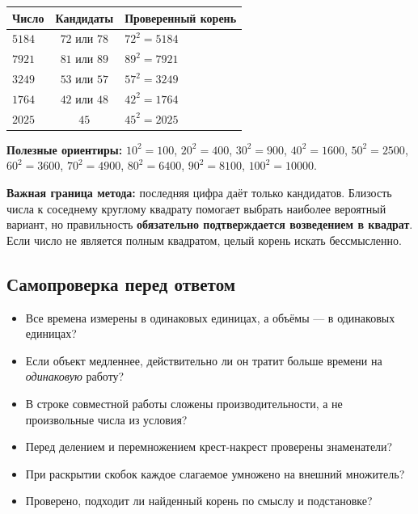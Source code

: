 \documentclass[a4paper,12pt]{article}
\newcommand{\subtopic}[1]{\subsection*{\textcolor{darkaccent}{#1}}}
\newcommand{\linekey}[1]{\textcolor{darkaccent}{\textbf{#1}}}
\begin{document}
\begin{center}
\begin{tabular}{@{}lcl@{}}
\toprule
Число & Кандидаты & Проверенный корень \\
\midrule
$5184$ & $72$ или $78$ & $72^2=5184$ \\
$7921$ & $81$ или $89$ & $89^2=7921$ \\
$3249$ & $53$ или $57$ & $57^2=3249$ \\
$1764$ & $42$ или $48$ & $42^2=1764$ \\
$2025$ & $45$ & $45^2=2025$ \\
\bottomrule
\end{tabular}
\end{center}

\linekey{Полезные ориентиры:} $10^2=100$, $20^2=400$, $30^2=900$, $40^2=1600$, $50^2=2500$, $60^2=3600$, $70^2=4900$, $80^2=6400$, $90^2=8100$, $100^2=10000$.

\textbf{Важная граница метода:} последняя цифра даёт только кандидатов. Близость числа к соседнему круглому квадрату помогает выбрать наиболее вероятный вариант, но правильность \textbf{обязательно подтверждается возведением в квадрат}. Если число не является полным квадратом, целый корень искать бессмысленно.

\subtopic{Самопроверка перед ответом}
\begin{itemize}
\item Все времена измерены в одинаковых единицах, а объёмы --- в одинаковых единицах?
\item Если объект медленнее, действительно ли он тратит больше времени на \emph{одинаковую} работу?
\item В строке совместной работы сложены производительности, а не произвольные числа из условия?
\item Перед делением и перемножением крест-накрест проверены знаменатели?
\item При раскрытии скобок каждое слагаемое умножено на внешний множитель?
\item Проверено, подходит ли найденный корень по смыслу и подстановке?
\end{itemize}
\end{document}
